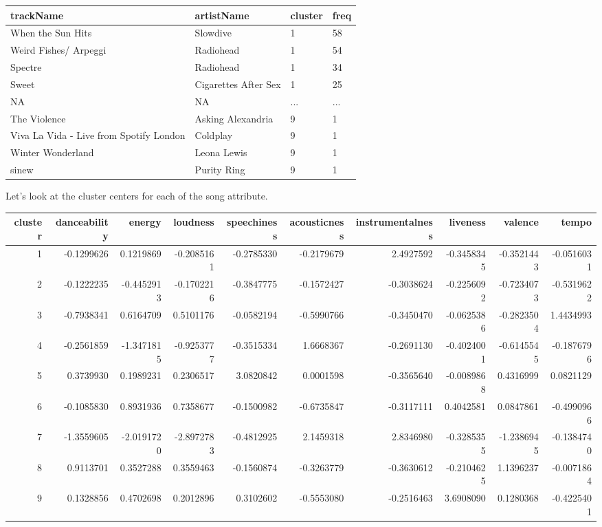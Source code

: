 \documentclass[
]{article}
\begin{document}
\begin{table}
\centering
\begin{tabular}{l|l|l|l}
\hline
trackName & artistName & cluster & freq\\
\hline
When the Sun Hits & Slowdive & 1 & 58\\
\hline
Weird Fishes/ Arpeggi & Radiohead & 1 & 54\\
\hline
Spectre & Radiohead & 1 & 34\\
\hline
Sweet & Cigarettes After Sex & 1 & 25\\
\hline
NA & NA & ... & ...\\
\hline
The Violence & Asking Alexandria & 9 & 1\\
\hline
Viva La Vida - Live from Spotify London & Coldplay & 9 & 1\\
\hline
Winter Wonderland & Leona Lewis & 9 & 1\\
\hline
sinew & Purity Ring & 9 & 1\\
\hline
\end{tabular}
\end{table}

Let's look at the cluster centers for each of the song attribute.

\begin{table}
\centering
\begin{tabular}{r|r|r|r|r|r|r|r|r|r}
\hline
cluster & danceability & energy & loudness & speechiness & acousticness & instrumentalness & liveness & valence & tempo\\
\hline
1 & -0.1299626 & 0.1219869 & -0.2085161 & -0.2785330 & -0.2179679 & 2.4927592 & -0.3458345 & -0.3521443 & -0.0516031\\
\hline
2 & -0.1222235 & -0.4452913 & -0.1702216 & -0.3847775 & -0.1572427 & -0.3038624 & -0.2256092 & -0.7234073 & -0.5319622\\
\hline
3 & -0.7938341 & 0.6164709 & 0.5101176 & -0.0582194 & -0.5990766 & -0.3450470 & -0.0625386 & -0.2823504 & 1.4434993\\
\hline
4 & -0.2561859 & -1.3471815 & -0.9253777 & -0.3515334 & 1.6668367 & -0.2691130 & -0.4024001 & -0.6145545 & -0.1876796\\
\hline
5 & 0.3739930 & 0.1989231 & 0.2306517 & 3.0820842 & 0.0001598 & -0.3565640 & -0.0089868 & 0.4316999 & 0.0821129\\
\hline
6 & -0.1085830 & 0.8931936 & 0.7358677 & -0.1500982 & -0.6735847 & -0.3117111 & 0.4042581 & 0.0847861 & -0.4990966\\
\hline
7 & -1.3559605 & -2.0191720 & -2.8972783 & -0.4812925 & 2.1459318 & 2.8346980 & -0.3285355 & -1.2386945 & -0.1384740\\
\hline
8 & 0.9113701 & 0.3527288 & 0.3559463 & -0.1560874 & -0.3263779 & -0.3630612 & -0.2104625 & 1.1396237 & -0.0071864\\
\hline
9 & 0.1328856 & 0.4702698 & 0.2012896 & 0.3102602 & -0.5553080 & -0.2516463 & 3.6908090 & 0.1280368 & -0.4225401\\
\hline
\end{tabular}
\end{table}
\end{document}
